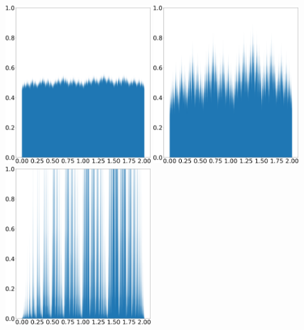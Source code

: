 \begin{figure}[H]
    \centering
    \includegraphics[width=0.48\textwidth]{figure/tent_tilted_shadow_density_0.01.png}
    \hspace{0.02\textwidth}
    \includegraphics[width=0.48\textwidth]{figure/tent_tilted_shadow_density_0.05.png}
    \\ \vspace{0.02\textwidth}
    \includegraphics[width=0.48\textwidth]{figure/tent_tilted_shadow_density_0.4.png}
    \hspace{0.02\textwidth}

\end{figure}

